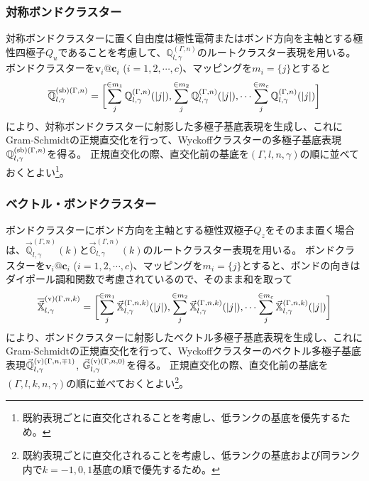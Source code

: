 \documentclass[11pt]{easymemo}
\begin{document}
\subsubsection{対称ボンドクラスター}

対称ボンドクラスターに置く自由度は極性電荷またはボンド方向を主軸とする極性四極子$Q_{u}$であることを考慮して、$\mathbb{Q}_{l,\gamma}^{(\Gamma,n)}$のルートクラスター表現を用いる。
ボンドクラスターを$\bm{v}_{i}@\bm{c}_{i}$ ($i=1,2,\cdots,c$)、マッピングを$m_{i}=\{j\}$とすると
\begin{align}
\overline{\mathbb{Q}}_{l,\gamma}^{{\rm (sb)}(\Gamma,n)}=\biggl[
\sum_{j}^{\in m_{1}}\mathbb{Q}_{l,\gamma}^{(\Gamma,n)}(|j|),
\sum_{j}^{\in m_{2}}\mathbb{Q}_{l,\gamma}^{(\Gamma,n)}(|j|),
\cdots
\sum_{j}^{\in m_{c}}\mathbb{Q}_{l,\gamma}^{(\Gamma,n)}(|j|)
\biggr]
\end{align}
により、対称ボンドクラスターに射影した多極子基底表現を生成し、これにGram-Schmidtの正規直交化を行って、Wyckoffクラスターの多極子基底表現$\mathbb{Q}_{l,\gamma}^{{\rm (sb)}(\Gamma,n)}$を得る。
正規直交化の際、直交化前の基底を$(\Gamma,l,n,\gamma)$の順に並べておくとよい\footnote{既約表現ごとに直交化されることを考慮し、低ランクの基底を優先するため。}。

\subsubsection{ベクトル・ボンドクラスター}

ボンドクラスターにボンド方向を主軸とする極性双極子$Q_{z}$をそのまま置く場合は、$\vec{\mathbb{Q}}_{l,\gamma}^{(\Gamma,n)}(k)$と$\vec{\mathbb{G}}_{l,\gamma}^{(\Gamma,n)}(k)$のルートクラスター表現を用いる。
ボンドクラスターを$\bm{v}_{i}@\bm{c}_{i}$ ($i=1,2,\cdots,c$)、マッピングを$m_{i}=\{j\}$とすると、ボンドの向きはダイポール調和関数で考慮されているので、そのまま和を取って
\begin{align}
\overline{\vec{\mathbb{X}}}_{l,\gamma}^{{\rm (v)}(\Gamma,n,k)}=\biggl[
\sum_{j}^{\in m_{1}}\vec{\mathbb{X}}_{l,\gamma}^{(\Gamma,n,k)}(|j|),
\sum_{j}^{\in m_{2}}\vec{\mathbb{X}}_{l,\gamma}^{(\Gamma,n,k)}(|j|),
\cdots
\sum_{j}^{\in m_{c}}\vec{\mathbb{X}}_{l,\gamma}^{(\Gamma,n,k)}(|j|)
\biggr]
\end{align}
により、ボンドクラスターに射影したベクトル多極子基底表現を生成し、これにGram-Schmidtの正規直交化を行って、Wyckoffクラスターのベクトル多極子基底表現$\vec{\mathbb{Q}}_{l,\gamma}^{{\rm (v)}(\Gamma,n,\mp1)}$, $\vec{\mathbb{G}}_{l,\gamma}^{{\rm (v)}(\Gamma,n,0)}$を得る。
正規直交化の際、直交化前の基底を$(\Gamma,l,k,n,\gamma)$の順に並べておくとよい\footnote{既約表現ごとに直交化されることを考慮し、低ランクの基底および同ランク内で$k=-1,0,1$基底の順で優先するため。}。
\end{document}
